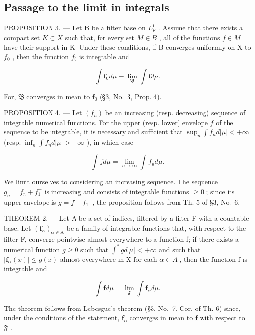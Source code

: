 \subsection{Passage to the limit in integrals}

PROPOSITION 3. --- Let B be a filter base on \(L_{F}^{1}\) . Assume that there exists a compact set \(K \subset X\) such that, for every set \(M \in B\) , all of the functions \(f \in M\) have their support in K. Under these conditions, if B converges uniformly on X to \(f_{0}\) , then the function \(f_{0}\) is integrable and

\[
\int \mathbf {f} _ {0} d \mu = \lim _ {\mathfrak {B}} \int \mathbf {f} d \mu .\tag{9}
\]

For, \(\mathfrak{B}\) converges in mean to \(\mathbf{f}_0\) (§3, No.~3, Prop. 4).

PROPOSITION 4. --- Let \((f_n)\) be an increasing (resp. decreasing) sequence of integrable numerical functions. For the upper (resp. lower) envelope \(f\) of the sequence to be integrable, it is necessary and sufficient that \(\sup_{n} \int f_n d|\mu| < +\infty\) (resp. \(\inf_{n} \int f_n d|\mu| > -\infty\) ), in which case

\[
\int f d \mu = \lim _ {n \to \infty} \int f _ {n} d \mu .\tag{10}
\]

We limit ourselves to considering an increasing sequence. The sequence \(g_{n} = f_{n} + f_{1}^{-}\) is increasing and consists of integrable functions \(\geqslant 0\) ; since its upper envelope is \(g = f + f_{1}^{-}\) , the proposition follows from Th. 5 of §3, No.~6.

THEOREM 2. --- Let A be a set of indices, filtered by a filter F with a countable base. Let \((\mathbf{f}_{\alpha})_{\alpha\in\mathrm{A}}\) be a family of integrable functions that, with respect to the filter F, converge pointwise almost everywhere to a function f; if there exists a numerical function \(g\geqslant0\) such that \(\int^{*}gd|\mu|<+\infty\) and such that \(|\mathbf{f}_{\alpha}(x)|\leqslant g(x)\) almost everywhere in X for each \(\alpha\in A\) , then the function f is integrable and

\[
\int \mathbf {f} d \mu = \lim _ {\mathfrak {F}} \int \mathbf {f} _ {\alpha} d \mu .\tag{11}
\]

The theorem follows from Lebesgue's theorem (§3, No.~7, Cor. of Th. 6) since, under the conditions of the statement, \(\mathbf{f}_{\alpha}\) converges in mean to \(\mathbf{f}\) with respect to \(\mathfrak{F}\) .

